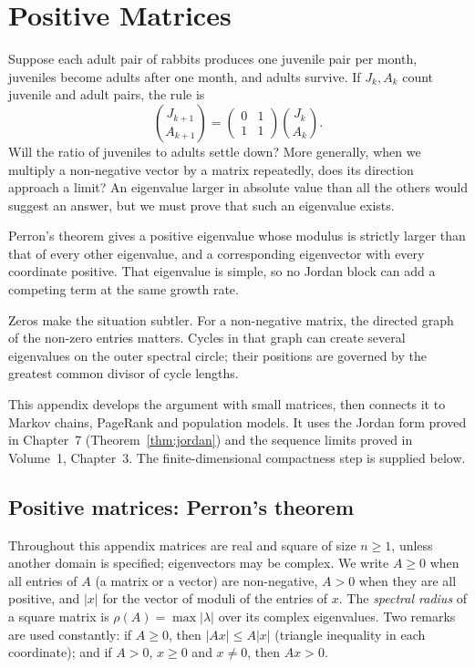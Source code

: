 \chapter{Positive Matrices}\label{linear:ch:perron}

Suppose each adult pair of rabbits produces one juvenile pair per month,
juveniles become adults after one month, and adults survive. If $J_k,A_k$
count juvenile and adult pairs, the rule is
\[
\binom{J_{k+1}}{A_{k+1}}=
\begin{pmatrix}0&1\\1&1\end{pmatrix}\binom{J_k}{A_k}.
\]
Will the ratio of juveniles to adults settle down? More generally, when we
multiply a non-negative vector by a matrix repeatedly, does its direction
approach a limit? An eigenvalue larger in absolute value than all the others
would suggest an answer, but we must prove that such an eigenvalue exists.

Perron's theorem gives a positive eigenvalue whose modulus is strictly larger
than that of every other eigenvalue, and a corresponding eigenvector with
every coordinate positive. That eigenvalue is simple, so no Jordan block
can add a competing term at the same growth rate.

Zeros make the situation subtler. For a non-negative matrix, the directed graph of the non-zero entries matters. Cycles in that graph can create several eigenvalues on the outer spectral circle; their positions are governed by the greatest common divisor of cycle lengths.

This appendix develops the argument with small matrices, then connects it to
Markov chains, PageRank and population models. It uses the Jordan form proved
in Chapter~7 (Theorem~\ref{thm:jordan}) and the sequence limits proved in Volume~1,
Chapter~3. The finite-dimensional compactness step is supplied below.

\section{Positive matrices: Perron's theorem}

Throughout this appendix matrices are real and square of size $n\ge1$, unless
another domain is specified; eigenvectors may be complex. We write $A\ge0$ when all entries of $A$ (a matrix or a vector) are non-negative, $A>0$ when they are all positive, and
$|x|$ for the vector of moduli of the entries of $x$. The \emph{spectral radius} of a square matrix is $\rho(A)=\max|\lambda|$
over its complex eigenvalues. Two remarks are used constantly: if $A\ge0$, then $|Ax|\le A|x|$ (triangle inequality in each
coordinate); and if $A>0$, $x\ge0$ and $x\ne0$, then $Ax>0$.

